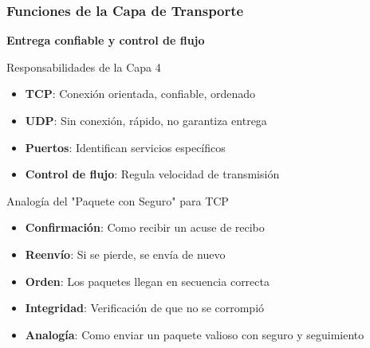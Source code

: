 \documentclass[aspectratio=169]{beamer}
\begin{document}
            \begin{frame}
            \frametitle{Funciones de la Capa de Transporte}
            
            \begin{center}
            \Large \textbf{Entrega confiable y control de flujo}
            \end{center}
            
        
            
            \begin{block}{Responsabilidades de la Capa 4}
            \begin{itemize}
            \item \textbf{TCP}: Conexión orientada, confiable, ordenado
            \item \textbf{UDP}: Sin conexión, rápido, no garantiza entrega
            \item \textbf{Puertos}: Identifican servicios específicos
            \item \textbf{Control de flujo}: Regula velocidad de transmisión
            \end{itemize}
            \end{block}
            
            \begin{block}{Analogía del "Paquete con Seguro" para TCP}
            \begin{itemize}
            \item \textbf{Confirmación}: Como recibir un acuse de recibo
            \item \textbf{Reenvío}: Si se pierde, se envía de nuevo
            \item \textbf{Orden}: Los paquetes llegan en secuencia correcta
            \item \textbf{Integridad}: Verificación de que no se corrompió
            \item \textbf{Analogía}: Como enviar un paquete valioso con seguro y seguimiento
            \end{itemize}
            \end{block}
            \end{frame}
            
\end{document}
